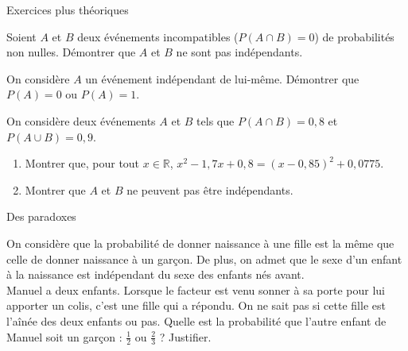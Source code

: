 \documentclass[11pt]{article}
\begin{document}
\begin{center}
  \Large
  Exercices plus théoriques
\end{center}

\begin{exo}[$\star$]
Soient $A$ et $B$ deux événements incompatibles
($P(A\cap B)=0$) de probabilités non nulles. Démontrer que $A$ et $B$ ne sont pas
indépendants.
\end{exo}

\begin{exo}[$\star$]
On considère $A$ un événement indépendant de lui-même. Démontrer que $P(A)=0$ ou
$P(A)=1$.
\end{exo}

\begin{exo}[$\star\star$]
On considère deux événements $A$ et $B$ tels que $P(A\cap B)=0,8$ et $P(A\cup
B)=0,9$.
\begin{enumerate}
  \item Montrer que, pour tout $x\in\mathbb{R}$,
    $x^2-1,7x+0,8=(x-0,85)^2+0,0775$.
  \item Montrer que $A$ et $B$ ne peuvent pas être indépendants.
\end{enumerate}
\end{exo}

\begin{center}
  \Large
  Des paradoxes
\end{center}

\begin{exo}
On considère que la probabilité de donner naissance à
une fille est la même que celle de donner naissance à un garçon. De plus, on
admet que le sexe d'un enfant à la naissance est indépendant du sexe des enfants
nés avant.\\
Manuel a deux enfants. Lorsque le facteur est venu sonner à sa porte pour lui
apporter un colis, c'est une fille qui a répondu. On ne sait pas si cette fille
est l'aînée des deux enfants ou pas. Quelle est la probabilité que l'autre
enfant de Manuel soit un garçon : $\frac{1}{2}$ ou $\frac{2}{3}$ ? Justifier.
\end{exo}
\end{document}

